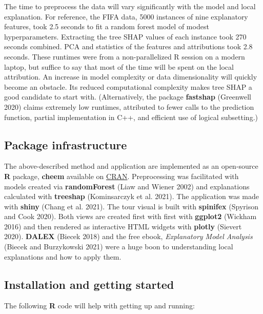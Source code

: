 \documentclass[
]{article}
\begin{document}
The time to preprocess the data will vary significantly with the model and local explanation. For reference, the FIFA data, 5000 instances of nine explanatory features, took 2.5 seconds to fit a random forest model of modest hyperparameters. Extracting the tree SHAP values of each instance took 270 seconds combined. PCA and statistics of the features and attributions took 2.8 seconds. These runtimes were from a non-parallelized R session on a modern laptop, but suffice to say that most of the time will be spent on the local attribution. An increase in model complexity or data dimensionality will quickly become an obstacle. Its reduced computational complexity makes tree SHAP a good candidate to start with. (Alternatively, the package \textbf{fastshap} (Greenwell 2020) claims extremely low runtimes, attributed to fewer calls to the prediction function, partial implementation in C++, and efficient use of logical subsetting.)

\hypertarget{sec:infrastructure}{%
\subsection{Package infrastructure}\label{sec:infrastructure}}

The above-described method and application are implemented as an open-source \textbf{R} package, \textbf{cheem} available on \href{https://CRAN.R-project.org/package=cheem}{CRAN}. Preprocessing was facilitated with models created via \textbf{randomForest} (Liaw and Wiener 2002) and explanations calculated with \textbf{treeshap} (Kominsarczyk et al. 2021). The application was made with \textbf{shiny} (Chang et al. 2021). The tour visual is built with \textbf{spinifex} (Spyrison and Cook 2020). Both views are created first with first with \textbf{ggplot2} (Wickham 2016) and then rendered as interactive HTML widgets with \textbf{plotly} (Sievert 2020). \textbf{DALEX} (Biecek 2018) and the free ebook, \emph{Explanatory Model Analysis} (Biecek and Burzykowski 2021) were a huge boon to understanding local explanations and how to apply them.

\hypertarget{installation-and-getting-started}{%
\subsection{Installation and getting started}\label{installation-and-getting-started}}

The following \textbf{R} code will help with getting up and running:
\end{document}
